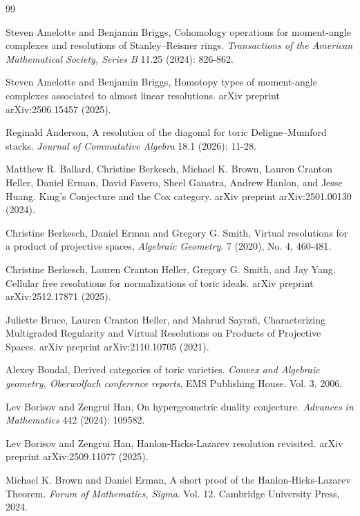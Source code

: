 \documentclass[11pt,reqno]{amsart}
\theoremstyle{definition}
\numberwithin{equation}{section}
\begin{document}
\begin{thebibliography}{99}

     Steven Amelotte and Benjamin Briggs, Cohomology operations for moment-angle complexes and resolutions of Stanley–Reisner rings. \textit{Transactions of the American Mathematical Society, Series B} 11.25 (2024): 826-862.

     Steven Amelotte and Benjamin Briggs, Homotopy types of moment-angle complexes associated to almost linear resolutions. arXiv preprint arXiv:2506.15457 (2025).

     Reginald Anderson, A resolution of the diagonal for toric Deligne–Mumford stacks. \textit{Journal of Commutative Algebra} 18.1 (2026): 11-28.

     Matthew R. Ballard, Christine Berkesch, Michael K. Brown, Lauren Cranton Heller, Daniel Erman, David Favero, Sheel Ganatra, Andrew Hanlon, and Jesse Huang. King's Conjecture and the Cox category. arXiv preprint arXiv:2501.00130 (2024).



     Christine Berkesch, Daniel Erman and Gregory G. Smith, Virtual resolutions for a product of projective spaces, \textit{Algebraic Geometry}. 7 (2020), No. 4, 460-481.

     Christine Berkesch, Lauren Cranton Heller, Gregory G. Smith, and Jay Yang, Cellular free resolutions for normalizations of toric ideals. arXiv preprint arXiv:2512.17871 (2025).

     Juliette Bruce, Lauren Cranton Heller, and Mahrud Sayrafi, Characterizing Multigraded Regularity and Virtual Resolutions on Products of Projective Spaces. arXiv preprint arXiv:2110.10705 (2021).

     Alexey Bondal, Derived categories of toric varieties. \textit{Convex and Algebraic geometry, Oberwolfach conference reports}, EMS Publishing House. Vol. 3. 2006.

     Lev Borisov and Zengrui Han, On hypergeometric duality conjecture. \textit{Advances in Mathematics} 442 (2024): 109582.

     Lev Borisov and Zengrui Han, Hanlon-Hicks-Lazarev resolution revisited. arXiv preprint arXiv:2509.11077 (2025).

     Michael K. Brown and Daniel Erman, A short proof of the Hanlon-Hicks-Lazarev Theorem. \textit{Forum of Mathematics, Sigma}. Vol. 12. Cambridge University Press, 2024.


\end{thebibliography}
\end{document}
